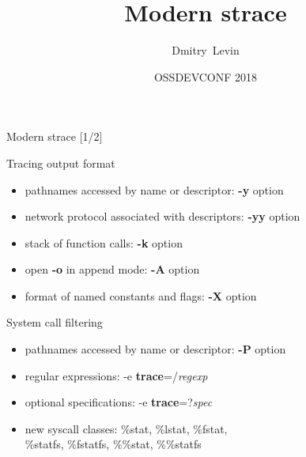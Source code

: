 \documentclass[unicode]{beamer}
\title{\Huge Modern strace}
\author{\Huge Dmitry~Levin}
\institute[BaseALT]{\Large BaseALT}
\date{OSSDEVCONF 2018}
\begin{document}
\begin{frame}
\titlepage
\end{frame}

\begin{frame}{Modern strace \hfill [1/2]}
\begin{block}{\large Tracing output format}
\begin{itemize}
\item pathnames accessed by name or descriptor: \textbf{-y} option
\item network protocol associated with descriptors: \textbf{-yy} option
\item stack of function calls: \textbf{-k} option
\item open \textbf{-o} in append mode: \textbf{-A} option
\item format of named constants and flags: \textbf{-X} option
\end{itemize}
\end{block}

\begin{block}{\large System call filtering}
\begin{itemize}
\item pathnames accessed by name or descriptor: \textbf{-P} option
\item regular expressions: -e \textbf{trace}=/\textit{regexp}
\item optional specifications: -e \textbf{trace}=?\textit{spec}
\item new syscall classes: \%stat, \%lstat, \%fstat, \\ \%statfs, \%fstatfs, \%\%stat, \%\%statfs
\end{itemize}
\end{block}
\end{frame}
\end{document}

